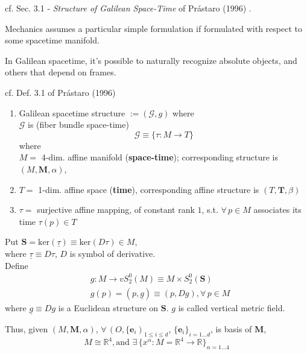 cf. Sec. 3.1 - \emph{Structure of Galilean Space-Time} of Pr\'{a}staro (1996) \cite{dgdt:Pras1996}.

Mechanics assumes a particular simple formulation if formulated with respect to some spacetime manifold.

In Galilean spacetime, it's possible to naturally recognize absolute objects, and others that depend on frames.

cf. Def. 3.1 of Pr\'{a}staro (1996) \cite{dgdt:Pras1996}
\begin{definition}
\begin{enumerate}
	\item Galilean spacetime structure $:= (\mathcal{G}, g)$ where \\
	$\mathcal{G}$ is (fiber bundle space-time)
	\begin{equation}
		\mathcal{G} \equiv \lbrace \tau : M \to T \rbrace
	\end{equation}
	where \\
	$M = $ 4-dim. affine manifold (\textbf{space-time}); corresponding structure is $(M, \mathbf{M}, \alpha)$, \\
\item	$T = $ 1-dim. affine space (\textbf{time}), corresponding affine structure is $(T, \mathbf{T}, \beta)$
\item $\tau = $ surjective affine mapping, of constant rank $1$, s.t. $\forall \, p \in M$ associates its time $\tau(p) \in T$
\end{enumerate}

Put $\mathbf{S} = \text{ker}(\underline{\tau}) \equiv \text{ker}(D\tau)\in M$, \\
	where $\underline{\tau} \equiv D\tau$, $D$ is symbol of derivative.\\	
	Define 
	\[
	\begin{aligned}
	& g: M \to vS_2^0(M) \equiv M \times S_2^0(\mathbf{S}) \\ 
	& g(p) = (p, \underline{g})  \equiv (p, Dg) , \forall \, p \in M
	\end{aligned}
	\]
	where $\underline{g} \equiv Dg$ is a Euclidean structure on $\mathbf{S}$.  $g$ is called vertical metric field.
\end{definition}

Thus, given $(M, \mathbf{M}, \alpha)$, $\forall \, (O, \lbrace \mathbf{e}_i)_{1 \leq i \leq d}$, $\lbrace \mathbf{e}_i \rbrace_{i=1\dots d}$, is basis of $\mathbf{M}$, 
\[
M \cong \mathbb{R}^4, \text{and } \exists \, \lbrace x^{\alpha} : M = \mathbb{R}^4 \to \mathbb{R} \rbrace_{\alpha = 1 \dots 4}
\]

